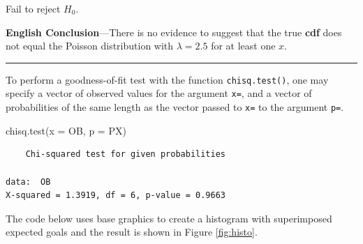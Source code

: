 \documentclass[
]{article}
\newenvironment{Shaded}{\begin{snugshade}}{\end{snugshade}}
\newcommand{\AttributeTok}[1]{\textcolor[rgb]{0.77,0.63,0.00}{#1}}
\newcommand{\ConstantTok}[1]{\textcolor[rgb]{0.00,0.00,0.00}{#1}}
\newcommand{\DecValTok}[1]{\textcolor[rgb]{0.00,0.00,0.81}{#1}}
\newcommand{\FloatTok}[1]{\textcolor[rgb]{0.00,0.00,0.81}{#1}}
\newcommand{\FunctionTok}[1]{\textcolor[rgb]{0.00,0.00,0.00}{#1}}
\newcommand{\NormalTok}[1]{#1}
\newcommand{\OtherTok}[1]{\textcolor[rgb]{0.56,0.35,0.01}{#1}}
\newcommand{\SpecialCharTok}[1]{\textcolor[rgb]{0.00,0.00,0.00}{#1}}
\newcommand{\StringTok}[1]{\textcolor[rgb]{0.31,0.60,0.02}{#1}}
\begin{document}
Fail to reject \(H_0\).

\textbf{English Conclusion}---There is no evidence to suggest that the true \textbf{cdf} does not equal the Poisson distribution with \(\lambda=2.5\) for at least one \(x\).

\begin{center}\rule{0.5\linewidth}{0.5pt}\end{center}

To perform a goodness-of-fit test with the function \texttt{chisq.test()}, one may specify a vector of observed values for the argument \texttt{x=}, and a vector of probabilities of the same length as the vector passed to \texttt{x=} to the argument \texttt{p=}.

\begin{Shaded}
\begin{Highlighting}[]
\FunctionTok{chisq.test}\NormalTok{(}\AttributeTok{x =}\NormalTok{ OB, }\AttributeTok{p =}\NormalTok{ PX)}
\end{Highlighting}
\end{Shaded}

\begin{verbatim}
    Chi-squared test for given probabilities

data:  OB
X-squared = 1.3919, df = 6, p-value = 0.9663
\end{verbatim}

The code below uses base graphics to create a histogram with superimposed expected goals and the result is shown in Figure \ref{fig:histo}.

\begin{Shaded}
\end{Shaded}
\end{document}
